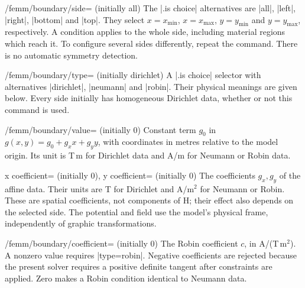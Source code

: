 \begin{key}{/femm/boundary/side= (initially all)}
The |.is choice| alternatives are |all|, |left|, |right|, |bottom| and |top|.
They select $x=x_{\min}$, $x=x_{\max}$, $y=y_{\min}$ and $y=y_{\max}$,
respectively. A condition applies to the whole side, including material
regions which reach it. To configure several sides differently, repeat
the command. There is no automatic symmetry detection.
\end{key}
\begin{key}{/femm/boundary/type= (initially dirichlet)}
A |.is choice| selector with alternatives |dirichlet|, |neumann| and
|robin|. Their physical meanings are given below. Every side initially
has homogeneous Dirichlet data, whether or not this command is used.
\end{key}
\begin{key}{/femm/boundary/value= (initially 0)}
Constant term $g_0$ in $g(x,y)=g_0+g_xx+g_yy$, with coordinates in metres
relative to the model origin. Its unit is T\,m for Dirichlet data and
A/m for Neumann or Robin data.
\end{key}
\begin{keylist}{x coefficient= (initially 0),
  y coefficient= (initially 0)}
The coefficients $g_x,g_y$ of the affine data. Their units are T for
Dirichlet and A/m$^2$ for Neumann or Robin. These are spatial coefficients,
not components of H; their effect also depends on the selected side.
The potential and field use the model's physical frame, independently of
graphic transformations.
\end{keylist}
\begin{key}{/femm/boundary/coefficient= (initially 0)}
The Robin coefficient $c$, in A/(T\,m$^2$). A nonzero value requires
|type=robin|. Negative coefficients are rejected because the present
solver requires a positive definite tangent after constraints are applied.
Zero makes a Robin condition identical to Neumann data.
\end{key}

\begin{codeexample}
\femmboundary[side=left,symmetry]
\end{codeexample}

